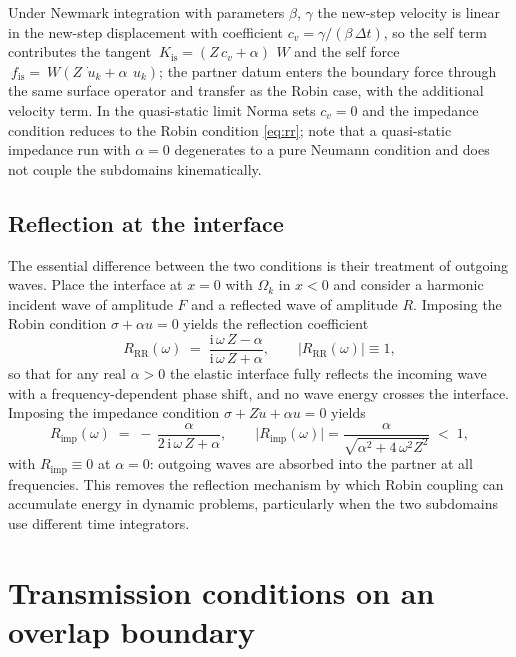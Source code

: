 \documentclass[11pt]{article}
\begin{document}
Under Newmark integration with parameters $\beta$, $\gamma$ the new-step
velocity is linear in the new-step displacement with coefficient
$c_v = \gamma/(\beta\,\Delta t)$, so the self term contributes the tangent
$~K_{\mathrm{is}} = (Z\,c_v + \alpha)\,~W$ and the self force
$~f_{\mathrm{is}} = ~W(Z\,\dot{~u}_k + \alpha\,~u_k)$; the partner datum
enters the boundary force through the same surface operator and transfer as
the Robin case, with the additional velocity term. In the quasi-static limit
Norma sets $c_v = 0$ and the impedance condition reduces to the Robin
condition \eqref{eq:rr}; note that a quasi-static impedance run with
$\alpha = 0$ degenerates to a pure Neumann condition and does not couple the
subdomains kinematically.

\subsection{Reflection at the interface}
\label{sec:reflection}

The essential difference between the two conditions is their treatment of
outgoing waves. Place the interface at $x = 0$ with $\Omega_k$ in $x < 0$
and consider a harmonic incident wave of amplitude $F$ and a reflected wave
of amplitude $R$. Imposing the Robin condition $\sigma + \alpha u = 0$
yields the reflection coefficient
\begin{equation}
  R_{\mathrm{RR}}(\omega) \;=\;
     \frac{\mathrm{i}\,\omega\,Z - \alpha}{\mathrm{i}\,\omega\,Z + \alpha},
  \qquad
  \lvert R_{\mathrm{RR}}(\omega) \rvert \equiv 1,
  \label{eq:R-rr}
\end{equation}
so that for any real $\alpha > 0$ the elastic interface fully reflects the
incoming wave with a frequency-dependent phase shift, and no wave energy
crosses the interface. Imposing the impedance condition
$\sigma + Z\dot u + \alpha u = 0$ yields
\begin{equation}
  R_{\mathrm{imp}}(\omega) \;=\;
     -\,\frac{\alpha}{2\,\mathrm{i}\,\omega\,Z + \alpha},
  \qquad
  \lvert R_{\mathrm{imp}}(\omega) \rvert
   = \frac{\alpha}{\sqrt{\alpha^2 + 4\,\omega^2 Z^2}} \;<\; 1,
  \label{eq:R-imp}
\end{equation}
with $R_{\mathrm{imp}} \equiv 0$ at $\alpha = 0$: outgoing waves are
absorbed into the partner at all frequencies. This removes the reflection
mechanism by which Robin coupling can accumulate energy in dynamic
problems, particularly when the two subdomains use different time
integrators.

\section{Transmission conditions on an overlap boundary}
\label{sec:overlap-tc}
\end{document}
